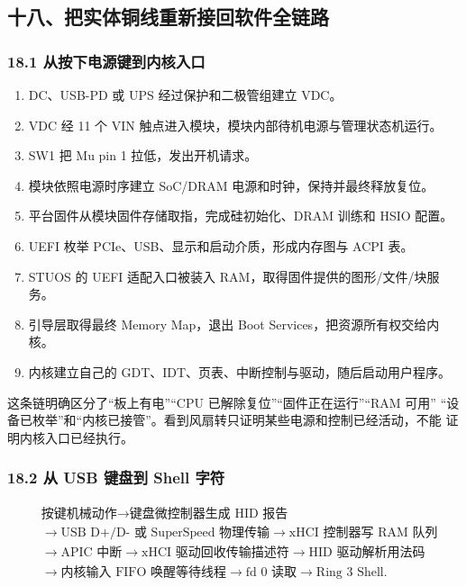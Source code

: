 \subsection{十八、把实体铜线重新接回软件全链路}

\subsubsection{18.1 从按下电源键到内核入口}

\begin{enumerate}[leftmargin=2em]
  \item DC、USB-PD 或 UPS 经过保护和二极管组建立 VDC。
  \item VDC 经 11 个 VIN 触点进入模块，模块内部待机电源与管理状态机运行。
  \item SW1 把 Mu pin 1  拉低，发出开机请求。
  \item 模块依照电源时序建立 SoC/DRAM 电源和时钟，保持并最终释放复位。
  \item 平台固件从模块固件存储取指，完成硅初始化、DRAM 训练和 HSIO 配置。
  \item UEFI 枚举 PCIe、USB、显示和启动介质，形成内存图与 ACPI 表。
  \item STUOS 的 UEFI 适配入口被装入 RAM，取得固件提供的图形/文件/块服务。
  \item 引导层取得最终 Memory Map，退出 Boot Services，把资源所有权交给内核。
  \item 内核建立自己的 GDT、IDT、页表、中断控制与驱动，随后启动用户程序。
\end{enumerate}

这条链明确区分了“板上有电”“CPU 已解除复位”“固件正在运行”“RAM 可用”
“设备已枚举”和“内核已接管”。看到风扇转只证明某些电源和控制已经活动，不能
证明内核入口已经执行。

\subsubsection{18.2 从 USB 键盘到 Shell 字符}

\[
\begin{aligned}
&\text{按键机械动作}
\rightarrow \text{键盘微控制器生成 HID 报告}\\
&\rightarrow \text{USB D+/D- 或 SuperSpeed 物理传输}
\rightarrow \text{xHCI 控制器写 RAM 队列}\\
&\rightarrow \text{APIC 中断}
\rightarrow \text{xHCI 驱动回收传输描述符}
\rightarrow \text{HID 驱动解析用法码}\\
&\rightarrow \text{内核输入 FIFO 唤醒等待线程}
\rightarrow \text{fd 0 读取}
\rightarrow \text{Ring 3 Shell}.
\end{aligned}
\]


